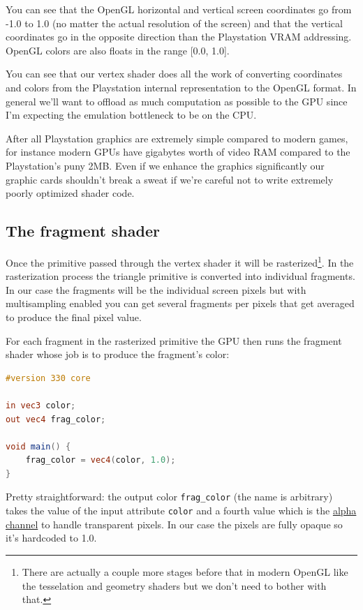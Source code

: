 \documentclass[a4paper]{article}
\newcommand{\code}[1] {\texttt{#1}}
\begin{document}
You can see that the OpenGL horizontal and vertical screen coordinates
go from -1.0 to 1.0 (no matter the actual resolution of the screen)
and that the vertical coordinates go in the opposite direction than
the Playstation VRAM addressing. OpenGL colors are also floats in the
range [0.0, 1.0].

You can see that our vertex shader does all the work of converting
coordinates and colors from the Playstation internal representation to
the OpenGL format. In general we'll want to offload as much
computation as possible to the GPU since I'm expecting the emulation
bottleneck to be on the CPU.

After all Playstation graphics are extremely simple compared to modern
games, for instance modern GPUs have gigabytes worth of video RAM
compared to the Playstation's puny 2MB. Even if we enhance the
graphics significantly our graphic cards shouldn't break a sweat if
we're careful not to write extremely poorly optimized shader code.

\subsection{The fragment shader}

Once the primitive passed through the vertex shader it will be
rasterized\footnote{There are actually a couple more stages before
  that in modern OpenGL like the tesselation and geometry shaders but
  we don't need to bother with that.}. In the rasterization process
the triangle primitive is converted into individual fragments. In our
case the fragments will be the individual screen pixels but with
multisampling enabled you can get several fragments per pixels that
get averaged to produce the final pixel value.

For each fragment in the rasterized primitive the GPU then runs the
fragment shader whose job is to produce the fragment's color:

\begin{lstlisting}[language=glsl]
#version 330 core

in vec3 color;
out vec4 frag_color;

void main() {
    frag_color = vec4(color, 1.0);
}
\end{lstlisting}

Pretty straightforward: the output color \code{frag\_color} (the name
is arbitrary) takes the value of the input attribute \code{color} and
a fourth value which is the
\href{https://en.wikipedia.org/wiki/Alpha_compositing}{alpha channel}
to handle transparent pixels. In our case the pixels are fully opaque
so it's hardcoded to 1.0.
\end{document}
